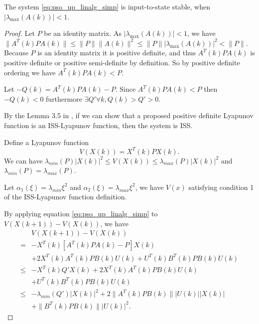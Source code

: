\begin{mythm}
\label{thm:iss}
The system \eqref{eq:pso_up_linalg_simp} is input-to-state stable, when $ | \lambda_{\max} ( A(k) ) | < 1 $.
\begin{proof}

Let $ P $ be an identity matrix.
As $ | \lambda_{\max} ( A(k) ) | < 1 $, we have
$ \lVert A^{T}(k) P A(k) \rVert \leq \lVert P \rVert \lVert A(k) \rVert^{2} \leq \lVert P \rVert | \lambda_{\max} ( A(k) ) |^{2} < \lVert P \rVert $.
Because $ P $ is an identity matrix it is positive definite, and thus $ A^{T}(k) P A(k) $ is positive definite or positive semi-definite by definition.
So by positive definite ordering we have $ A^{T}(k) P A(k) < P $.

Let $ -Q(k) = A^{T}(k) P A(k) - P $. Since $ A^{T}(k) P A(k) < P $ then $ - Q(k) < 0 $ furthermore $ \exists Q' \forall k, Q(k) > Q' > 0 $. 

By the Lemma 3.5 in \cite{Jiang2001857}, if we can show that a proposed positive definite Lyapunov function is an ISS-Lyapunov function, then the system is ISS.

Define a Lyapunov function
\begin{equation}
\label{eq:lyapunov_v}
V( X(k) ) = X^{T} (k) P X(k).
\end{equation}
We can have
$
\lambda_{min}(P) | X(k) |^{2} \leq V( X(k) )\leq \lambda_{max}(P) | X(k) |^{2}
$ and $ \lambda_{min}(P) = \lambda_{max}(P) $.

Let $ \alpha_{1} ( \xi )= \lambda_{min} \xi^{2} $
and 
$ \alpha_{2} ( \xi )= \lambda_{max} \xi^{2} $,
we have $ V(x) $ satisfying condition 1 of the ISS-Lyapunov function definition.

By applying equation \eqref{eq:pso_up_linalg_simp} to $ V( X(k+1) ) - V( X(k) ) $, we have
\begin{equation}
\label{eq:lyapunov_delta2}
\begin{aligned}
& V( X(k+1) ) - V( X(k) ) \\
= & - X^{T}(k) [ A^{T}(k) P A(k) - P ] X(k) \\
& + 2 X^{T}(k)  A^{T}(k) P B(k) U(k) + U^{T}(k) B^{T}(k) P B(k) U(k) \\
\leq & - X^{T}(k) Q' X(k) + 2 X^{T}(k)  A^{T}(k) P B(k) U(k) \\
& + U^{T}(k) B^{T}(k) P B(k) U(k) \\
\leq & - \lambda_{min}(Q') | X(k) |^{2} + 2  \lVert A^{T}(k) P B(k) \rVert | U(k) | | X(k) | \\
& + \lVert B^{T}(k) P B(k) \rVert | U(k) |^{2}.
\end{aligned}
\end{equation}


\end{proof}
\end{mythm}
